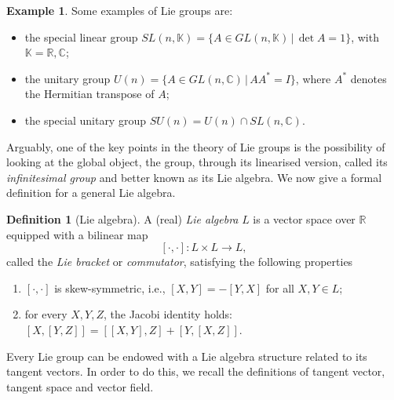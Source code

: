 \documentclass[12pt,oneside,a4paper]{book}
\numberwithin{equation}{section}     %
\theoremstyle{plain}
\theoremstyle{definition}
\newtheorem{definition}[theorem]{Definition}
\newtheorem{example}[theorem]{Example}
\newcommand{\C}{{\mathbb C}}
\newcommand{\R}{{\mathbb R}}
\begin{document}
\begin{example}
	Some examples of Lie groups are:
	\begin{itemize}
		\item the special linear group $SL(n, \mathbb{K}) = \{A \in GL(n, \mathbb{K}) \,|\, \det A = 1\}$, with $\mathbb{K}=\R,\C$;
		
		\item the unitary group $U(n) = \{A \in GL(n,\C)\,|\, AA^* = I\}$, where $A^*$ denotes the Hermitian transpose of $A$;
		
		\item the special unitary group $SU(n)=U(n)\cap SL(n,\C)$.
	\end{itemize}
\end{example}

Arguably, one of the key points in the theory of Lie groups is the possibility of looking at the global object, the group, through its linearised version,  called its \textit{infinitesimal group} and better known as its Lie algebra. We now give a formal definition for a general Lie algebra.
\begin{definition}[Lie algebra]
	\label{Liealgebra}
	A (real) \textit{Lie algebra} $L$ is a vector space over $\R$ equipped with a bilinear map
	$$
	[\cdot,\cdot]:L\times L\rightarrow L,
	$$
	called the \textit{Lie bracket} or \textit{commutator}, satisfying the following properties
	\begin{enumerate}[1.]
		\item $[\cdot,\cdot]$ is skew-symmetric, i.e., $[X,Y]=-[Y,X]$ for all $X,Y\in L$;
		\item for every $X,Y,Z$, the Jacobi identity holds: $[X,[Y,Z]]=[[X,Y],Z]+[Y,[X,Z]]$.
	\end{enumerate}
\end{definition}
Every Lie group can be endowed with a Lie algebra structure related to its tangent vectors. In order to do this, we recall the definitions of tangent vector, tangent space and vector field.
\end{document}
